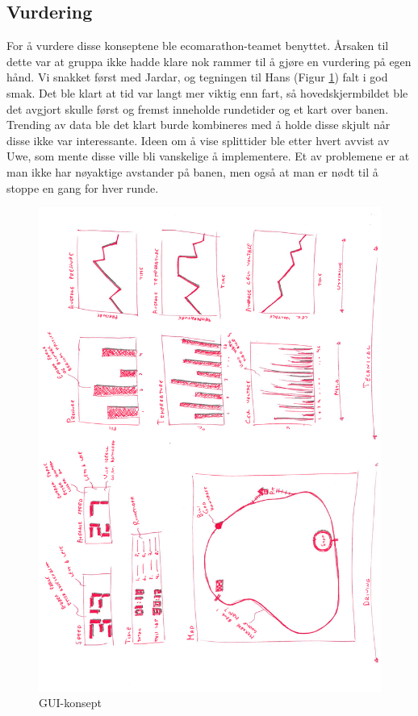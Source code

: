 \subsection{Vurdering}
For å vurdere disse konseptene ble ecomarathon-teamet benyttet.
Årsaken til dette var at gruppa ikke hadde klare nok rammer til å gjøre en vurdering på egen hånd.
Vi snakket først med Jardar, og tegningen til Hans (Figur \ref{gui-concept}) falt i god smak. 
Det ble klart at tid var langt mer viktig enn fart, så hovedskjermbildet ble det avgjort skulle først og fremst inneholde rundetider og et kart over banen. 
Trending av data ble det klart burde kombineres med å holde disse skjult når disse ikke var interessante.
Ideen om å vise splittider ble etter hvert avvist av Uwe, som mente disse ville bli vanskelige å implementere. 
Et av problemene er at man ikke har nøyaktige avstander på banen, men også at man er nødt til å stoppe en gang for hver runde.

\begin{figure}[H]
\caption{GUI-konsept} 
\label{gui-concept}
\includegraphics[width=\textwidth]{images/gui_concept_hans.pdf}
\end{figure}

